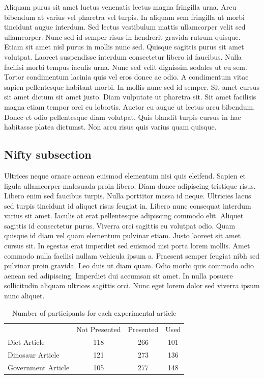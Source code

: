 \documentclass[12pt,twoside]{mitthesis}
\begin{document}
Aliquam purus sit amet luctus venenatis lectus magna fringilla urna. Arcu bibendum at varius vel pharetra vel turpis. In aliquam sem fringilla ut morbi tincidunt augue interdum. Sed lectus vestibulum mattis ullamcorper velit sed ullamcorper. Nunc sed id semper risus in hendrerit gravida rutrum quisque. Etiam sit amet nisl purus in mollis nunc sed. Quisque sagittis purus sit amet volutpat. Laoreet suspendisse interdum consectetur libero id faucibus. Nulla facilisi morbi tempus iaculis urna. Nunc sed velit dignissim sodales ut eu sem. Tortor condimentum lacinia quis vel eros donec ac odio. A condimentum vitae sapien pellentesque habitant morbi. In mollis nunc sed id semper. Sit amet cursus sit amet dictum sit amet justo. Diam vulputate ut pharetra sit. Sit amet facilisis magna etiam tempor orci eu lobortis. Auctor eu augue ut lectus arcu bibendum. Donec et odio pellentesque diam volutpat. Quis blandit turpis cursus in hac habitasse platea dictumst. Non arcu risus quis varius quam quisque.

\subsection{Nifty subsection}

Ultrices neque ornare aenean euismod elementum nisi quis eleifend. Sapien et ligula ullamcorper malesuada proin libero. Diam donec adipiscing tristique risus. Libero enim sed faucibus turpis. Nulla porttitor massa id neque. Ultricies lacus sed turpis tincidunt id aliquet risus feugiat in. Libero nunc consequat interdum varius sit amet. Iaculis at erat pellentesque adipiscing commodo elit. Aliquet sagittis id consectetur purus. Viverra orci sagittis eu volutpat odio. Quam quisque id diam vel quam elementum pulvinar etiam. Justo laoreet sit amet cursus sit. In egestas erat imperdiet sed euismod nisi porta lorem mollis. Amet commodo nulla facilisi nullam vehicula ipsum a. Praesent semper feugiat nibh sed pulvinar proin gravida. Leo duis ut diam quam. Odio morbi quis commodo odio aenean sed adipiscing. Imperdiet dui accumsan sit amet. In nulla posuere sollicitudin aliquam ultrices sagittis orci. Nunc eget lorem dolor sed viverra ipsum nunc aliquet.

\begin{table}[htb]
\centering
\begin{tabular}{lccc}
                   & Not Presented & Presented & Used \\
Diet Article       & 118           & 266       & 101  \\
Dinosaur Article   & 121           & 273       & 136  \\
Government Article & 105           & 277       & 148 
\end{tabular}
\caption{Number of participants for each experimental article}
\end{table}
\end{document}
